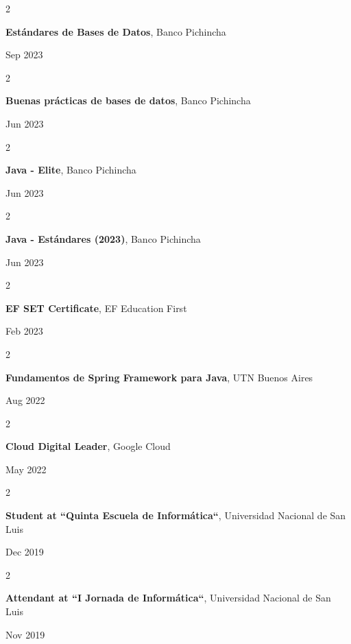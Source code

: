 \documentclass[10pt, letterpaper]{article}
\newenvironment{twocolentry}[2][]{
    \onecolentry
    \def\secondColumn{#2}
    \setcolumnwidth{\fill, 4.5 cm}
    \begin{paracol}{2}
}{
    \switchcolumn \raggedleft \secondColumn
    \end{paracol}
    \endonecolentry
} %
\begin{document}
    \begin{twocolentry}{
            Sep 2023
        }
        \textbf{Estándares de Bases de Datos}, Banco Pichincha
    \end{twocolentry}
    \begin{twocolentry}{
            Jun 2023
        }
        \textbf{Buenas prácticas de bases de datos}, Banco Pichincha
    \end{twocolentry}
    \begin{twocolentry}{
            Jun 2023
        }
        \textbf{Java - Elite}, Banco Pichincha
    \end{twocolentry}
    \begin{twocolentry}{
            Jun 2023
        }
        \textbf{Java - Estándares (2023)}, Banco Pichincha
    \end{twocolentry}
    \begin{twocolentry}{
            Feb 2023
        }
        \textbf{EF SET Certificate}, EF Education First
    \end{twocolentry}
    \begin{twocolentry}{
            Aug 2022
        }
        \textbf{Fundamentos de Spring Framework para Java}, UTN Buenos Aires
    \end{twocolentry}
    \begin{twocolentry}{
            May 2022
        }
        \textbf{Cloud Digital Leader}, Google Cloud
    \end{twocolentry}
    \begin{twocolentry}{
            Dec 2019
        }
        \textbf{Student at “Quinta Escuela de Informática“}, Universidad Nacional de San Luis
    \end{twocolentry}
    \begin{twocolentry}{
            Nov 2019
        }
        \textbf{Attendant at “I Jornada de Informática“}, Universidad Nacional de San Luis
    \end{twocolentry}
\end{document}
